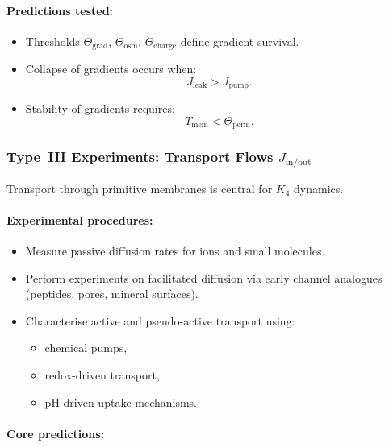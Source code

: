 \paragraph{Predictions tested:}

\begin{itemize}
    \item Thresholds $\Theta_{\mathrm{grad}}$, $\Theta_{\mathrm{osm}}$,
          $\Theta_{\mathrm{charge}}$ define gradient survival.
    \item Collapse of gradients occurs when:
          \[
             J_{\mathrm{leak}} > J_{\mathrm{pump}}.
          \]
    \item Stability of gradients requires:
          \[
             T_{\mathrm{mem}} < \Theta_{\mathrm{perm}}.
          \]
\end{itemize}



\subsubsection{Type~III Experiments: Transport Flows $J_{\mathrm{in/out}}$}

Transport through primitive membranes is central for $K_4$ dynamics.

\paragraph{Experimental procedures:}

\begin{itemize}
    \item Measure passive diffusion rates for ions and small molecules.
    \item Perform experiments on facilitated diffusion via early channel
          analogues (peptides, pores, mineral surfaces).
    \item Characterise active and pseudo-active transport using:
          \begin{itemize}
              \item chemical pumps,
              \item redox-driven transport,
              \item pH-driven uptake mechanisms.
          \end{itemize}
\end{itemize}

\paragraph{Core predictions:}

